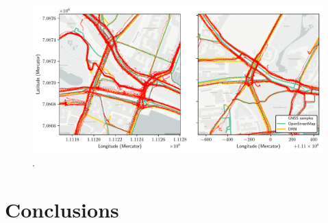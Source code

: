 \begin{figure}[htbp]
\centering 
\includegraphics[width=\linewidth]{images/routing-mapmatching-distance.pdf}
\caption{.}
\label{fig:}
\end{figure}


\section{Conclusions}